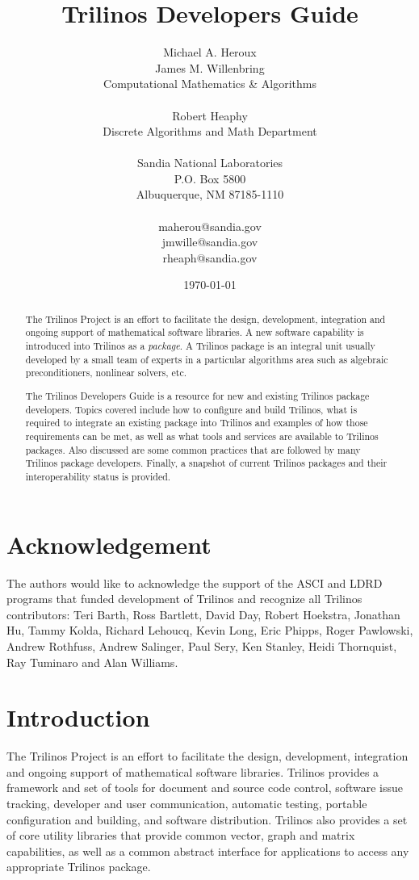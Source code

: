 \documentclass[12pt,relax]{TrilinosDevGuide}
\title{Trilinos Developers Guide}
\author{
Michael A. Heroux \\
James M. Willenbring\\
Computational Mathematics \& Algorithms \\
 \\
Robert Heaphy \\
Discrete Algorithms and Math Department \\
 \\
Sandia National Laboratories\\
P.O. Box 5800\\
Albuquerque, NM 87185-1110 \\
 \\
maherou@sandia.gov \\
jmwille@sandia.gov \\
rheaph@sandia.gov \\
}
\date{\today} %
\begin{document}
\maketitle
\setcounter{page}{3} %
\begin{abstract}

The Trilinos Project is an effort to facilitate the design, development,
integration and ongoing support of mathematical software libraries.
A new software capability is introduced into Trilinos as a {\it
package}.  A Trilinos package is an integral unit usually developed by
a small team of experts in a particular algorithms area such as
algebraic preconditioners, nonlinear solvers, etc.

The Trilinos Developers Guide is a resource for new and existing
Trilinos package developers.  Topics covered include how to configure and 
build Trilinos, what is required to integrate an existing package into Trilinos
and examples of how those requirements can be met, as well as what
tools and services are 
available to Trilinos packages.  Also discussed are some common practices that 
are followed by many Trilinos package developers.  Finally, a snapshot
of current Trilinos packages and their interoperability status
is provided.

\end{abstract}


\section*{Acknowledgement}
The authors would like to acknowledge the support of the ASCI and LDRD 
programs that funded development of Trilinos and recognize all Trilinos 
contributors: Teri Barth, Ross Bartlett, David Day, Robert Hoekstra, 
Jonathan Hu, Tammy Kolda, Richard Lehoucq, Kevin Long, Eric Phipps, 
Roger Pawlowski, Andrew Rothfuss, Andrew Salinger, Paul Sery, Ken
Stanley, Heidi Thornquist, Ray Tuminaro and Alan Williams.

\clearpage
\tableofcontents
\listoffigures
\listoftables

\clearpage


\section{Introduction}
\label{Section:Introduction}
The Trilinos Project is an effort to facilitate the design, development,
integration and ongoing support of mathematical software libraries.  Trilinos 
provides a framework and set of tools for document and source code control,
software issue tracking, developer and user communication, automatic
testing, portable configuration and building, and software
distribution.  Trilinos also provides a set of core utility libraries
that provide common vector, graph and matrix capabilities, as well as
a common abstract interface for applications to access any appropriate
Trilinos package.
\end{document}
